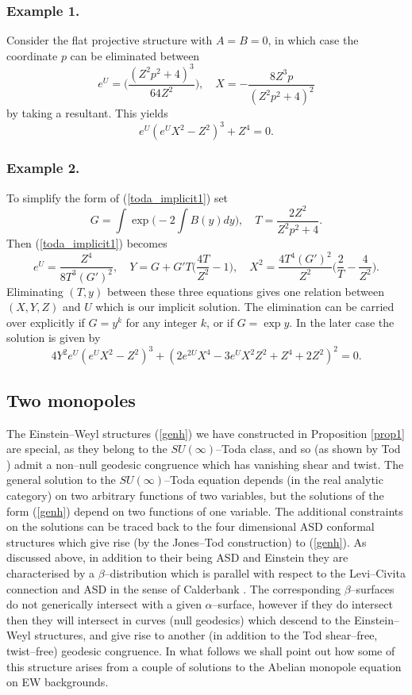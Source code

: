 \subsubsection{Example 1.}
Consider the flat projective structure with $A=B=0$, in which case
the coordinate $p$ can be eliminated between
\[
e^U=\bigg(\frac{(Z^2p^2+4)^3}{64Z^2}\bigg), \quad
X=-\frac{8Z^3p}{(Z^2p^2+4)^2}
\]
by taking a resultant. This yields
\[
e^U(e^UX^2-Z^2)^3+Z^4=0.
\]
\subsubsection{Example 2.}
To simplify the form of (\ref{toda_implicit1}) set
\[
G=\int\exp{\Big(-2\int B(y)dy\Big)}, \quad T=\frac{2Z^2}{Z^2p^2+4}.
\]
Then (\ref{toda_implicit1}) becomes
\[
e^U=\frac{Z^4}{8T^3 (G')^2}, \quad Y=G+G'T\Big(\frac{4T}{Z^2}-1\Big), \quad
X^2=\frac{4T^4(G')^2}{Z^2}\Big(\frac{2}{T}-\frac{4}{Z^2} \Big).
\]
Eliminating $(T, y)$ between these three equations gives one relation between $(X, Y, Z)$ and  $U$ which is our implicit solution.
The elimination can be carried over explicitly if $G=y^k$ for any integer $k$, or if $G=\exp{y}$. In the later case the solution is given by
\[
4Y^2e^U(e^UX^2-Z^2)^3+(2e^{2U}X^4-3e^UX^2Z^2+Z^4+2Z^2)^2=0.
\]
\subsection{Two monopoles}
The Einstein--Weyl structures  (\ref{genh}) we have constructed in Proposition \ref{prop1}
are special, as they belong to the $SU(\infty)$--Toda class, and so
(as shown by Tod \cite{Tod_toda}) admit a non--null geodesic congruence which has vanishing shear and twist.
The general solution to the $SU(\infty)$--Toda equation depends (in the real analytic category) on 
two arbitrary functions of two variables, but the solutions of the form (\ref{genh}) depend on two functions of one variable. The additional constraints on the solutions can be traced back to the four dimensional ASD conformal structures
which give rise (by the Jones--Tod construction) to (\ref{genh}). As discussed above, in addition to their being ASD and Einstein
they are  characterised \cite{DM} by a $\beta$--distribution which is parallel with respect to the Levi--Civita connection and ASD in the sense of Calderbank \cite{Cal1}.
The corresponding $\beta$--surfaces do not generically intersect with a given $\alpha$--surface, however if they do intersect then they will intersect in curves (null geodesics) which descend to the Einstein--Weyl structures, and give
rise to another (in addition to the Tod shear--free, twist--free) geodesic congruence.
In what follows we shall point out how some of this structure arises from a couple of solutions to the Abelian monopole
equation on EW  backgrounds.

